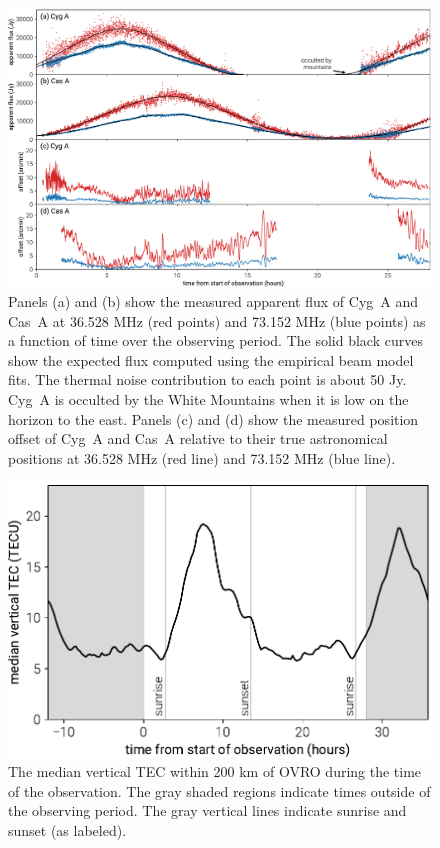 \documentclass[twocolumn]{aastex61}
\begin{document}
\begin{figure}[t]
    \includegraphics[width=\textwidth]{figures/scintillation-refraction/scintillation-refraction}
    \caption{
        Panels (a) and (b) show the measured apparent flux of Cyg~A and Cas~A at 36.528 MHz (red
        points) and 73.152 MHz (blue points) as a function of time over the observing period. The
        solid black curves show the expected flux computed using the empirical beam model fits. The
        thermal noise contribution to each point is about 50 Jy.  Cyg~A is occulted by the White
        Mountains when it is low on the horizon to the east.
        Panels (c) and (d) show the measured position offset of Cyg~A and Cas~A relative to their
        true astronomical positions at 36.528 MHz (red line) and 73.152 MHz (blue line).
    }
    \label{fig:scintillation}
\end{figure}

\begin{figure}[t]
    \includegraphics[width=\columnwidth]{figures/vtec/vtec}
    \caption{
        The median vertical TEC within 200 km of OVRO during the time of the observation. The gray
        shaded regions indicate times outside of the observing period. The gray vertical lines
        indicate sunrise and sunset (as labeled).
    }
    \label{fig:vtec}
\end{figure}
\end{document}
